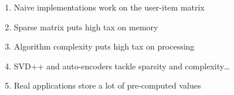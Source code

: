 
	\begin{enumerate}
        \item<1->\alert<1>{ Naive implementations work on the user-item matrix}
        \item<2->\alert<2>{ Sparse matrix puts high tax on memory}
        \item<3->\alert<3>{ Algorithm complexity puts high tax on processing}
        \vspace{2ex}
        \item<4->\alert<4>{ SVD++ and auto-encoders tackle sparsity and complexity\ldots}
        \item<5->\alert<5>{ Real applications store a lot of pre-computed values}
    \end{enumerate}
